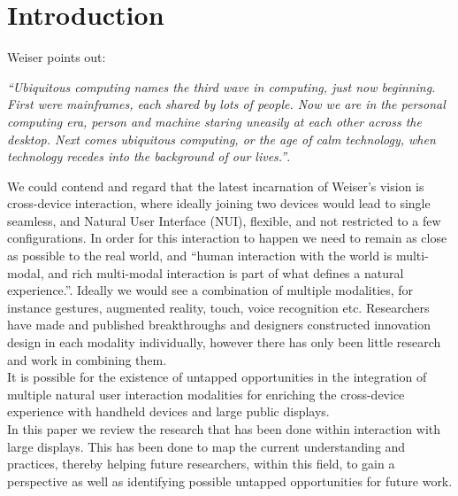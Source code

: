 \section{Introduction}
Weiser\cite{Weiser:1991} points out:
 
{\em``Ubiquitous computing names the third wave in computing, just now beginning. First were mainframes, each shared by lots of people. Now we are in the personal computing era, person and machine staring uneasily at each other across the desktop. Next comes ubiquitous computing, or the age of calm technology, when technology recedes into the background of our lives.''}.

We could contend and regard that the latest incarnation of Weiser's vision is cross-device interaction, where ideally joining two devices would lead to single seamless, and Natural User Interface (NUI), flexible, and not restricted to a few configurations\cite{Radle:2015}.
In order for this interaction to happen we need to remain as close as possible to the real world, and ``human interaction with the world is multi-modal, and rich multi-modal interaction is part of what defines a natural experience.''\cite{Jain:2011}. 
Ideally we would see a combination of multiple modalities, for instance gestures, augmented reality, touch, voice recognition etc. 
Researchers have made and published breakthroughs and designers constructed innovation design in each modality individually, however there has only been little research and work in combining them.\cite{Jain:2011} \\

It is possible for the existence of untapped opportunities in the integration of multiple natural user interaction modalities for enriching the cross-device experience with handheld devices and large public displays. \\

In this paper we review the research that has been done within interaction with large displays. 
This has been done to map the current understanding and practices, thereby helping future researchers, within this field, to gain a perspective as well as identifying possible untapped opportunities for future work.
